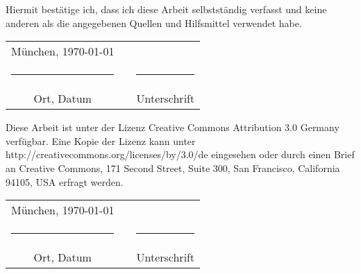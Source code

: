 \thispagestyle{plain}
\vspace*{3cm}
Hiermit best\"atige ich, dass ich diese Arbeit selbstst\"andig verfasst und keine anderen als die angegebenen Quellen und Hilfsmittel verwendet habe.



\vspace{2cm}

\hspace{1cm}\begin{tabular}{ccc}
\vspace{-0.3cm}M\"unchen, \today	&\hspace{4cm} 		& \\
\rule{4.5cm}{0.4pt}					&					&\rule{4.5cm}{0.4pt}\\
Ort, Datum							&					& Unterschrift			
\end{tabular}

           		






\vspace{4cm}
Diese Arbeit ist unter der Lizenz Creative Commons Attribution 3.0 Germany verf\"ugbar. Eine Kopie der Lizenz kann unter http://creativecommons.org/licenses/by/3.0/de eingesehen oder durch einen Brief an Creative Commons, 171 Second Street, Suite 300, San Francisco, California 94105, USA erfragt werden.
\vspace{2cm}



\hspace{1cm}\begin{tabular}{ccc}
\vspace{-0.3cm}M\"unchen, \today 	&\hspace{4cm} 		& \\
\rule{4.5cm}{0.4pt}					&					&\rule{4.5cm}{0.4pt}\\
Ort, Datum							&					& Unterschrift			
\end{tabular}